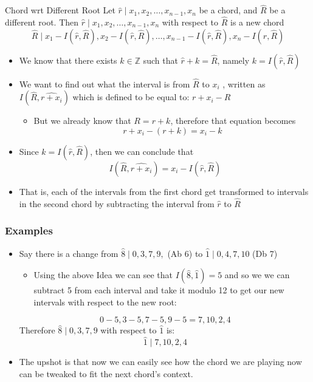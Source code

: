 \documentclass{standalone}
\begin{document}
\begin{theo*}{Chord wrt Different Root}
  Let $ \widehat{r} \mid x_{1} , x_{2} , \dotsc  , x_{n - 1} , x_{n}$ be a chord, and $ \widehat{R}$ be a different root. Then $ \widehat{r} \mid x_{1} , x_{2} , \dotsc  , x_{n - 1} , x_    {n}$ with respect to $ \widehat{R}$ is a new chord
  \[
  \widehat{R} \mid x_{1}  -  I\left( \widehat{r}, \widehat{R}\right) , x_{2}-  I\left( \widehat{r}, \widehat{R}\right) , \dotsc  , x_{n - 1}-  I\left( \widehat{r}, \widehat{R}\right) , x_{n}-  I\left( \widehat{r}, \widehat{R}\right)
  \]
  \begin{pf}
    \begin{itemize}
      \item We know that there exists $k \in \mathbb{Z}$ such that $ \widehat{r}  +  k = \widehat{R}$, namely $k = I\left( \widehat{r}, \widehat{R}\right)$                               
      \item We want to find out what the interval is from $ \widehat{R}$ to  $x_{i}$ , written as $I\left( \widehat{R}, \widehat{r  +  x_{i}}\right)$ which is defined to be equal to: $ r  +  x_{i}  -  R$
        \begin{itemize}
          \item But we already know that $R = r  + k$, therefore that equation becomes
            \[
            r  +  x_{i}   -  \left( r  +  k \right) = x_{i}  -  k 
            \]
        \end{itemize}
      \item Since $k = I\left( \widehat{r}, \widehat{R}\right)$, then we can conclude that 
        \[
        I\left( \widehat{R}, \widehat{r  +  x_{i}}\right)= x_{i}  -  I\left( \widehat{r}, \widehat{R}\right)
        \]
      \item That is, each of the intervals from the first chord get transformed to intervals in the second chord by subtracting the interval from $ \widehat{r}$ to $ \widehat{R}$ 
    \end{itemize}
  \end{pf}
  \subsubsection*{Examples}
  \begin{itemize}
    \item Say there is a change from $ \widehat{8} \mid 0, 3, 7, 9,$ (Ab 6) to $ \widehat{1} \mid 0, 4, 7, 10$ (Db 7)
      \begin{itemize}
        \item Using the above Idea we can see that $I\left( \widehat{8}, \widehat{1}\right) = 5$ and so we we can subtract 5 from each interval and take it modulo 12 to get our new intervals with respect to the new root:
      \end{itemize}
      \[
      0  - 5, 3 -5, 7 -5, 9 -5  = 7, 10, 2, 4 
      \]
      Therefore $ \widehat{8} \mid 0, 3, 7, 9$ with respect to $ \widehat{1}$ is: 
      \[
      \widehat{1} \mid 7, 10, 2, 4 
      \]
    \item The upshot is that now we can easily see how the chord we are playing now can be tweaked to fit the next chord's context.
  \end{itemize}
\end{theo*}
\end{document}
